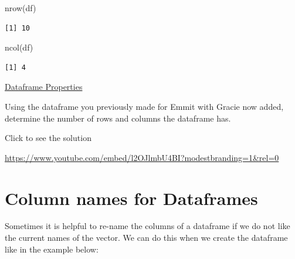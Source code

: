 \documentclass[
  letterpaper,
  DIV=11,
  numbers=noendperiod]{scrreprt}
\newenvironment{Shaded}{\begin{snugshade}}{\end{snugshade}}
\newcommand{\FunctionTok}[1]{\textcolor[rgb]{0.28,0.35,0.67}{#1}}
\newcommand{\NormalTok}[1]{\textcolor[rgb]{0.00,0.23,0.31}{#1}}
\begin{document}
\begin{Shaded}
\begin{Highlighting}[]
\FunctionTok{nrow}\NormalTok{(df)}
\end{Highlighting}
\end{Shaded}

\begin{verbatim}
[1] 10
\end{verbatim}

\begin{Shaded}
\begin{Highlighting}[]
\FunctionTok{ncol}\NormalTok{(df)}
\end{Highlighting}
\end{Shaded}

\begin{verbatim}
[1] 4
\end{verbatim}

\begin{watch}{}{}
    \href{https://youtu.be/fYxmRUeK4qw}{Dataframe Properties}
\end{watch}

\begin{tcolorbox}[enhanced jigsaw, leftrule=.75mm, arc=.35mm, coltitle=black, rightrule=.15mm, bottomrule=.15mm, toprule=.15mm, left=2mm, colbacktitle=quarto-callout-tip-color!10!white, title=\textcolor{quarto-callout-tip-color}{\faLightbulb}\hspace{0.5em}{Try it Out}, toptitle=1mm, breakable, colframe=quarto-callout-tip-color-frame, bottomtitle=1mm, titlerule=0mm, colback=white, opacityback=0, opacitybacktitle=0.6]

Using the dataframe you previously made for Emmit with Gracie now added,
determine the number of rows and columns the dataframe has.

Click to see the solution

\url{https://www.youtube.com/embed/l2OJlmbU4BI?modestbranding=1&rel=0}

\end{tcolorbox}

\section{Column names for Dataframes}\label{column-names-for-dataframes}

Sometimes it is helpful to re-name the columns of a dataframe if we do
not like the current names of the vector. We can do this when we create
the dataframe like in the example below:
\end{document}
